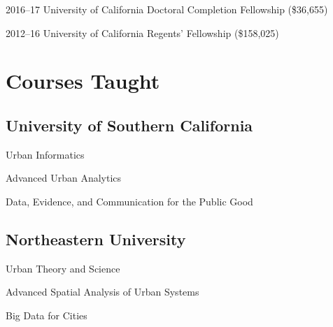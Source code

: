 \documentclass[11pt,letterpaper]{report}
\newcommand{\listitemspace}{0.25em}
\renewenvironment{itemize}
{\begin{list}{}{\setlength{\leftmargin}{0em}
                \setlength{\parskip}{0em}
                \setlength{\itemsep}{\listitemspace}
                \setlength{\parsep}{\listitemspace}}}
{\end{list}}
\begin{document}
\begin{tablist}
        \item[2016--17] \tab{}University of California Doctoral Completion Fellowship (\$36,655)




        \item[2012--16] \tab{}University of California Regents' Fellowship (\$158,025)

    \end{tablist}



    \section*{Courses Taught}

    \subsection*{University of Southern California}

    \begin{itemize}

        \item Urban Informatics
        \item Advanced Urban Analytics
        \item Data, Evidence, and Communication for the Public Good

    \end{itemize}

    \subsection*{Northeastern University}

    \begin{itemize}

        \item Urban Theory and Science
        \item Advanced Spatial Analysis of Urban Systems
        \item Big Data for Cities

    \end{itemize}
\end{document}
